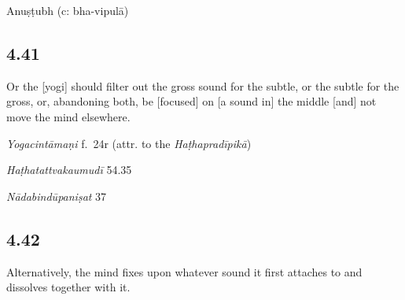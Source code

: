 \begin{ekdosis}

\begin{metre}[hp04_040]
Anuṣṭubh (c: bha-vipulā)
\end{metre}

\subsection*{4.41}
\begin{translation}[hp04_041]
Or the [yogi] should filter out the gross sound for the subtle, or the subtle for the gross, or, abandoning both, be [focused] on [a sound in] the middle [and] not move the mind elsewhere.%
\end{translation} %


\begin{testimonia}[hp04_041]
\emph{Yogacintāmaṇi} f.~24r (attr. to the \emph{Haṭhapradīpikā})
\begin{versinnote}
\end{versinnote}

\emph{Haṭhatattvakaumudī} 54.35
\begin{versinnote}
\end{versinnote}

\emph{Nādabindūpaniṣat} 37
\begin{versinnote}
\end{versinnote}
\end{testimonia}


\subsection*{4.42}
\begin{translation}[hp04_042]
Alternatively, the mind fixes upon whatever sound it first attaches to and dissolves together with it.
\end{translation}


\end{ekdosis}
